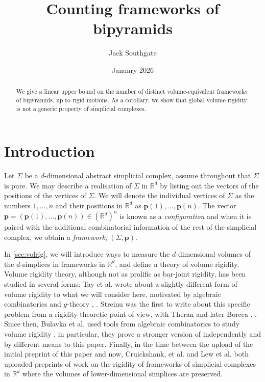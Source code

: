 \documentclass[11pt]{amsart}
\title{Counting frameworks of bipyramids}
\author{Jack Southgate}
\date{January 2026}
\theoremstyle{definition}
\theoremstyle{remark}
\newcommand*{\defn}[1]{{\color{purple}\textit{#1}}}
\begin{document}
\begin{abstract}
    We give a linear upper bound on the number of distinct volume-equivalent frameworks of bipyramids, up to rigid motions.
    As a corollary, we show that global volume rigidity is not a generic property of simplicial complexes.
\end{abstract}

\maketitle

\section{Introduction}\label{sec:intro}

Let $\Sigma$ be a $d$-dimensional abstract simplicial complex, assume throughout that $\Sigma$ is pure.
We may describe a realisation of $\Sigma$ in $\mathbb{R}^d$ by listing out the vectors of the positions of the vertices of $\Sigma$.
We will denote the individual vertices of $\Sigma$ as the numbers $1,\dots,n$ and their positions in $\mathbb{R}^d$ as $\mathbf{p}(1),\dots,\mathbf{p}(n)$.
The vector $\mathbf{p}=(\mathbf{p}(1),\dots,\mathbf{p}(n))\in(\mathbb{R}^d)^n$ is known as a \defn{configuration} and when it is paired with the additional combinatorial information of the rest of the simplicial complex, we obtain a \defn{framework}, $(\Sigma,\mathbf{p})$.

In \cref{sec:volrig}, we will introduce ways to measure the $d$-dimensional volumes of the $d$-simplices in frameworks in $\mathbb{R}^d$, and define a theory of volume rigidity.
Volume rigidity theory, although not as prolific as bar-joint rigidity, has been studied in several forms:
Tay et al. wrote about a slightly different form of volume rigidity to what we will consider here, motivated by algebraic combinatorics and $g$-theory \cite{tay1995skeletal1}, \cite{tay1995skeletal2}.
Streinu was the first to write about this specific problem from a rigidity theoretic point of view, with Theran \cite{streinu2007algorithms} and later Borcea \cite{borcea2012realizations}, \cite{borcea2014volume}.
Since then, Bulavka et al. used tools from algebraic combinatorics to study volume rigidity \cite{bulavka2022volume}, in particular, they prove a stronger version of  independently and by different means to this paper.
Finally, in the time between the upload of the initial preprint of this paper and now, Cruickshank, et al. \cite{cruickshank2025volume} and Lew et al. \cite{lew2025k} both uploaded preprints of work on the rigidity of frameworks of simplicial complexes in $\mathbb{R}^d$ where the volumes of lower-dimensional simplices are preserved.
\end{document}
